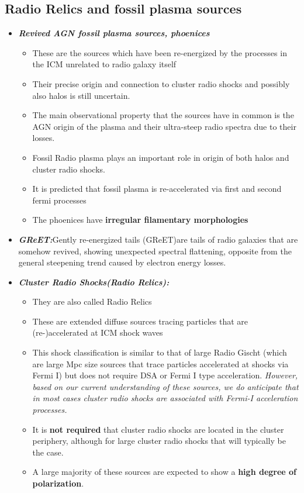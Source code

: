 \documentclass[11pt]{report}
\newcommand{\tbf}[1]{\textbf{#1}}
\newcommand{\tit}[1]{\textit{#1}}
\begin{document}
 \subsection{Radio Relics and fossil plasma sources}
 \begin{itemize}
 \item \tbf{\tit{Revived AGN fossil plasma sources, phoenices}}
 \begin{itemize}
 
\item These are the sources which have been re-energized by the processes in the ICM unrelated to radio galaxy itself
\item Their precise origin and connection to cluster radio shocks and possibly also halos is still uncertain. 
\item The main observational property that the sources have in common is the AGN origin of the plasma and their ultra-steep radio spectra due to their losses.
\item Fossil Radio plasma plays an important role in origin of both halos and cluster radio shocks.
\item It is predicted that fossil plasma is re-accelerated via first and second fermi processes
\item The phoenices have \tbf{irregular filamentary morphologies}
 \end{itemize}
 \item  \tbf{\tit{GReET:}}Gently re-energized tails (GReET)are tails of radio galaxies that are somehow revived, showing unexpected spectral flattening, opposite from the general steepening trend caused by electron energy losses.
 \item \tbf{\tit{Cluster Radio Shocks(Radio Relics):}}
 \begin{itemize}
 \item They are also called Radio Relics
 \item These are  extended diffuse sources tracing particles that are (re-)accelerated at ICM shock waves
 \item This shock classification is similar to that of large Radio Gischt (which  are large Mpc size sources that trace particles accelerated at shocks via Fermi I) but does not require DSA or Fermi I type acceleration. \tit{However, based on our current understanding of these sources, we do anticipate that in most cases cluster radio shocks are associated with Fermi-I acceleration processes.}
 \item It is \tbf{not required} that cluster radio shocks are located in the cluster periphery, although for large cluster radio shocks that will typically be the case. 
 \item A large majority of these sources are expected to show a \tbf{high degree of polarization}. 
 

\end{itemize}
\end{itemize}
\end{document}
